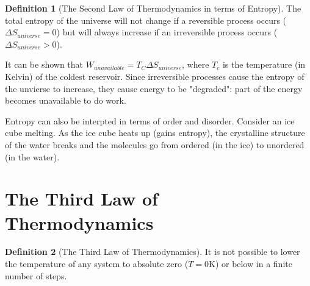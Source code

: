 \documentclass[12pt, a4paper]{article}
\theoremstyle{definition}
\newtheorem{definition}{Definition}
\begin{document}
\begin{definition}[The Second Law of Thermodynamics in terms of Entropy]
    The total entropy of the universe will not change if a reversible process occurs ($\Delta S_{universe} = 0$)
    but will always increase if an irreversible process occurs ($\Delta S_{universe} > 0$).
\end{definition}

It can be shown that $W_{unavailable} = T_C \Delta S_{universe}$, where $T_c$ is the temperature (in Kelvin) of the coldest reservoir.
Since irreversible processes cause the entropy of the unvierse to increase, they cause energy to be "degraded": part of the energy becomes unavailable to do work.

Entropy can also be interpted in terms of order and disorder.
Consider an ice cube melting.
As the ice cube heats up (gains entropy), the crystalline structure of the water breaks and the molecules go from ordered (in the ice) to unordered (in the water).



\section{The Third Law of Thermodynamics}
\begin{definition}[The Third Law of Thermodynamics]
    It is not possible to lower the temperature of any system to absolute zero ($T = 0\textrm{K}$) or below in a finite number of steps.
\end{definition}
\end{document}
